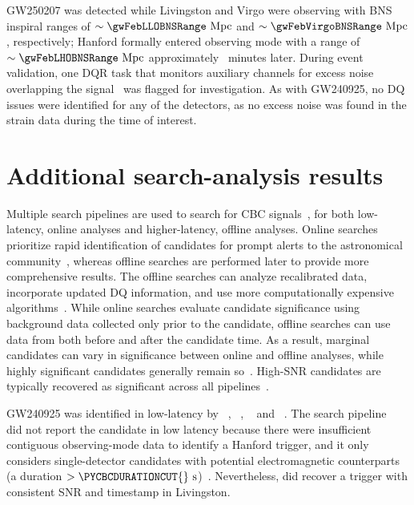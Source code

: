 \ac{GW250207} was detected while Livingston and Virgo were observing with \acl{BNS} inspiral ranges of $\sim\gwFebLLOBNSRange~\mathrm{Mpc}$ and $\sim\gwFebVirgoBNSRange~\mathrm{Mpc}$, respectively; Hanford formally entered observing mode with a range of $\sim\gwFebLHOBNSRange~\mathrm{Mpc}$ approximately \FEBARTIMEDELAY{}~minutes later.
During event validation, one \ac{DQR} task that monitors auxiliary channels for excess noise overlapping the signal~\cite{Macas:2023zdu} was flagged for investigation.
As with \ac{GW240925}, no \ac{DQ} issues were identified for any of the detectors, as no excess noise was found in the strain data during the time of interest.

\section{Additional search-analysis results}

Multiple search pipelines are used to search for \ac{CBC} signals~\cite{LIGOScientific:2025yae}, for both low-latency, online analyses and higher-latency, offline analyses.
Online searches prioritize rapid identification of candidates for prompt alerts to the astronomical community~\cite{LIGOScientific:2019gag,KAGRA:2021vkt}, whereas offline searches are performed later to provide more comprehensive results.
The offline searches can analyze recalibrated data, incorporate updated \ac{DQ} information, and use more computationally expensive algorithms~\cite{LIGOScientific:2025yae}.
While online searches evaluate candidate significance using background data collected only prior to the candidate, offline searches can use data from both before and after the candidate time.
As a result, marginal candidates can vary in significance between online and offline analyses, while highly significant candidates generally remain so~\cite{LIGOScientific:2025slb}.
High-\ac{SNR} candidates are typically recovered as significant across all pipelines~\cite{KAGRA:2021vkt,LIGOScientific:2025yae}.

\ac{GW240925} was identified in low-latency by ~\cite{Klimenko:2005xv,Klimenko:2008fu,Klimenko:2015ypf,Mishra:2024zzs}, ~\cite{Messick:2016aqy, Sachdev:2019vvd, Hanna:2019ezx, Cannon:2020qnf, Sakon:2022ibh, Ewing:2023qqe, Tsukada:2023edh, Joshi:2025nty, Joshi:2025zdu}, ~\cite{Adams:2015ulm, Aubin:2020goo, Allene:2025saz} and ~\cite{Chu:2020pjv}.
The \PYCBC{} search pipeline~\cite{DalCanton:2020vpm} did not report the candidate in low latency because there were insufficient contiguous observing-mode data to identify a Hanford trigger, and it only considers single-detector candidates with potential electromagnetic counterparts (a duration $>\PYCBCDURATIONCUT{}~\mathrm{s}$)~\cite{DalCanton:2020vpm,LIGOScientific:2025yae}.
Nevertheless, \PYCBC did recover a trigger with consistent \ac{SNR} and timestamp in Livingston.

